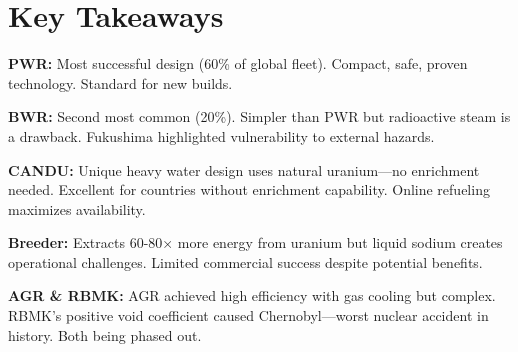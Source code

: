 \documentclass{article}
\begin{document}
\section*{Key Takeaways}

\textbf{PWR:} Most successful design (60\% of global fleet). Compact, safe, proven technology. Standard for new builds.

\textbf{BWR:} Second most common (20\%). Simpler than PWR but radioactive steam is a drawback. Fukushima highlighted vulnerability to external hazards.

\textbf{CANDU:} Unique heavy water design uses natural uranium—no enrichment needed. Excellent for countries without enrichment capability. Online refueling maximizes availability.

\textbf{Breeder:} Extracts 60-80× more energy from uranium but liquid sodium creates operational challenges. Limited commercial success despite potential benefits.

\textbf{AGR \& RBMK:} AGR achieved high efficiency with gas cooling but complex. RBMK's positive void coefficient caused Chernobyl—worst nuclear accident in history. Both being phased out.
\end{document}
